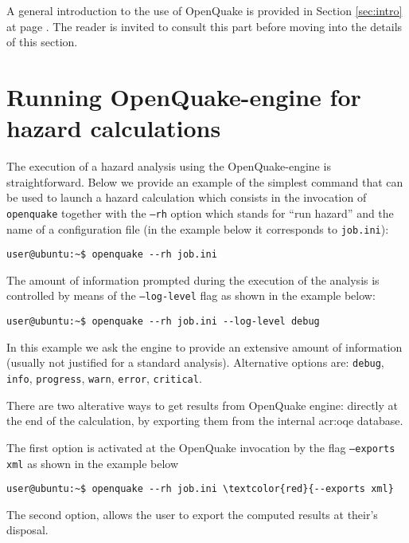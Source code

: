 A general introduction to the use of OpenQuake is provided in Section 
\ref{sec:intro} at page \pageref{sec:intro}.
The reader is invited to consult this part before moving into
the details of this section.

\section{Running OpenQuake-engine for hazard calculations}
The execution of a hazard analysis using the OpenQuake-engine 
is straightforward. Below we provide an example of the simplest 
command that can be used to launch a hazard calculation which 
consists in the invocation of \texttt{openquake} together with 
the \texttt{--rh} option which stands for ``run hazard'' and 
the name of a configuration file (in the example below
it corresponds to \texttt{job.ini}):
\begin{Verbatim}[frame=single, commandchars=\\\{\}, fontsize=\small]
user@ubuntu:~$ openquake --rh job.ini
\end{Verbatim}

The amount of information prompted during the execution of the 
analysis is controlled by means of the \texttt{--log-level} flag 
as shown in the example below:
\begin{Verbatim}[frame=single, commandchars=\\\{\}, fontsize=\small]
user@ubuntu:~$ openquake --rh job.ini --log-level debug
\end{Verbatim}
In this example we ask the engine to provide an extensive amount
of information (usually not justified for a standard analysis). 
Alternative options are: \texttt{debug}, \texttt{info}, \texttt{progress},
\texttt{warn}, \texttt{error}, \texttt{critical}.

There are two alterative ways to get results from OpenQuake engine:
directly at the end of the calculation, by exporting them from the 
internal \gls{acr:oqe} database. 

The first option is activated at the OpenQuake invocation by the flag 
\texttt{--exports xml} as shown in the example below
\begin{Verbatim}[frame=single, commandchars=\\\{\}, fontsize=\small]
user@ubuntu:~$ openquake --rh job.ini \textcolor{red}{--exports xml}
\end{Verbatim}
The second option, allows the user to export the computed results at 
their's disposal.

